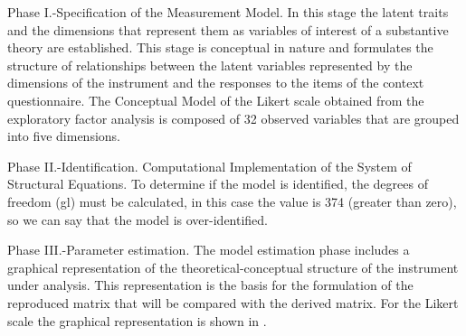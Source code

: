 \documentclass[english]{textolivre}
\begin{document}
Phase I.-Specification of the Measurement Model. In this stage the latent traits and the dimensions that represent them as variables of interest of a substantive theory are established. This stage is conceptual in nature and formulates the structure of relationships between the latent variables represented by the dimensions of the instrument and the responses to the items of the context questionnaire. The Conceptual Model of the Likert scale obtained from the exploratory factor analysis is composed of 32 observed variables that are grouped into five dimensions.

Phase II.-Identification. Computational Implementation of the System of Structural Equations. To determine if the model is identified, the degrees of freedom (gl) must be calculated, in this case the value is 374 (greater than zero), so we can say that the model is over-identified.

Phase III.-Parameter estimation. The model estimation phase includes a graphical representation of the theoretical-conceptual structure of the instrument under analysis. This representation is the basis for the formulation of the reproduced matrix that will be compared with the derived matrix. For the Likert scale the graphical representation is shown in .
\end{document}
